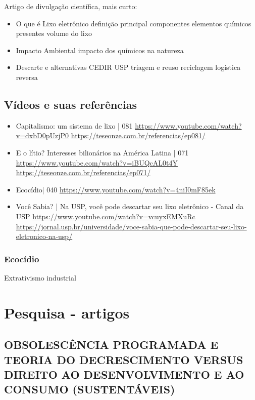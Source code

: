 \documentclass[
	article,			%
	11pt,				%
	oneside,			%
	a4paper,			%
	english,			%
	brazil,				%
	sumario=tradicional
	]{abntex2}
\begin{document}
Artigo de divulgação científica, mais curto: 
\begin{itemize}
	\item O que é Lixo eletrônico
	\subitem definição 
	\subitem principal componentes
	\subitem elementos químicos presentes
	\subitem volume do lixo
	\item Impacto Ambiental
	\subitem impacto dos químicos na natureza
	\item Descarte e alternativas
	\subitem CEDIR USP
	\subitem triagem e reuso
	\subitem reciclagem
	\subitem logística reversa
\end{itemize}


\subsection{Vídeos e suas referências}

\begin{itemize}
   \item Capitalismo: um sistema de lixo | 081
   \subitem \url{https://www.youtube.com/watch?v=dxbD0pUzjP0}
   \subitem \url{https://teseonze.com.br/referencias/ep081/}
   \item E o lítio? Interesses bilionários na América Latina | 071
   \subitem \url{https://www.youtube.com/watch?v=iBUQcAL0t4Y}
   \subitem \url{https://teseonze.com.br/referencias/ep071/}
   \item Ecocídio| 040
   \subitem \url{https://www.youtube.com/watch?v=4niI0mF85ek}
   \item Você Sabia? | Na USP, você pode descartar seu lixo eletrônico - Canal da USP
   \subitem \url{https://www.youtube.com/watch?v=vcuyxEMXuRc}
   \subitem \url{https://jornal.usp.br/universidade/voce-sabia-que-pode-descartar-seu-lixo-eletronico-na-usp/}
\end{itemize}

\subsubsection{Ecocídio}

Extrativismo industrial


\section{Pesquisa - artigos}

\subsection{OBSOLESCÊNCIA PROGRAMADA E TEORIA DO DECRESCIMENTO VERSUS DIREITO AO DESENVOLVIMENTO E AO CONSUMO (SUSTENTÁVEIS)}
\end{document}
